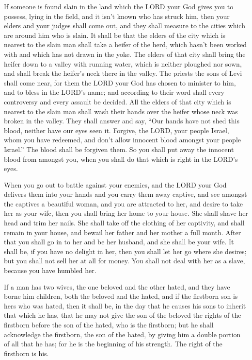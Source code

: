  If someone is found slain in the land which the LORD your
God gives you to possess, lying in the field, and it isn't known who has
struck him,  then your elders and your judges shall come
out, and they shall measure to the cities which are around him who is
slain.  It shall be that the elders of the city which is
nearest to the slain man shall take a heifer of the herd, which hasn't
been worked with and which has not drawn in the yoke.  The
elders of that city shall bring the heifer down to a valley with running
water, which is neither ploughed nor sown, and shall break the heifer's
neck there in the valley.  The priests the sons of Levi
shall come near, for them the LORD your God has chosen to minister to
him, and to bless in the LORD's name; and according to their word shall
every controversy and every assault be decided.  All the
elders of that city which is nearest to the slain man shall wash their
hands over the heifer whose neck was broken in the valley. 
They shall answer and say, ``Our hands have not shed this blood, neither
have our eyes seen it.  Forgive, the LORD, your people
Israel, whom you have redeemed, and don't allow innocent blood amongst
your people Israel.'' The blood shall be forgiven them.  So
you shall put away the innocent blood from amongst you, when you shall
do that which is right in the LORD's eyes.

 When you go out to battle against your enemies, and the
LORD your God delivers them into your hands and you carry them away
captive,  and see amongst the captives a beautiful woman,
and you are attracted to her, and desire to take her as your wife,
 then you shall bring her home to your house. She shall
shave her head and trim her nails.  She shall take off the
clothing of her captivity, and shall remain in your house, and bewail
her father and her mother a full month. After that you shall go in to
her and be her husband, and she shall be your wife.  It
shall be, if you have no delight in her, then you shall let her go where
she desires; but you shall not sell her at all for money. You shall not
deal with her as a slave, because you have humbled her.

 If a man has two wives, the one beloved and the other
hated, and they have borne him children, both the beloved and the hated,
and if the firstborn son is hers who was hated,  then it
shall be, in the day that he causes his sons to inherit that which he
has, that he may not give the son of the beloved the rights of the
firstborn before the son of the hated, who is the firstborn;
 but he shall acknowledge the firstborn, the son of the
hated, by giving him a double portion of all that he has; for he is the
beginning of his strength. The right of the firstborn is his.

